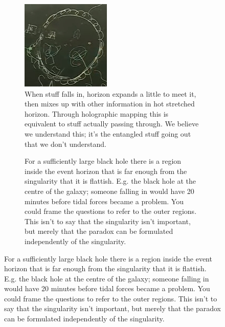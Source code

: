 \documentclass[]{article}
\begin{document}
\begin{figure}[H]
	\begin{center}
		\caption{	Questions.}
		\begin{subfigure}[t]{0.45\textwidth}
			\caption{When stuff falls in, horizon expands  a little to meet it, then mixes up with other information in hot stretched horizon. Through holographic mapping this is equivalent to stuff actually passing through. We believe we understand this; it's the entangled stuff going out that we don't understand.}\label{fig:ibh-horizon-falling-in}
			\includegraphics[width=\textwidth]{ibh-horizon-falling-in}
		\end{subfigure}
		\;
		\begin{subfigure}[t]{0.45\textwidth}
			\caption{For a sufficiently large black hole there is a region inside the event horizon that is far enough from the singularity that it is flattish. E.g. the black hole at the centre of the galaxy; someone falling in would have 20 minutes before tidal forces became a problem. You could frame the questions to refer to the outer regions. This isn't to say that the singularity isn't important, but merely that the paradox can be formulated independently of the singularity. }\label{fig:ibh-horizon-inside-large}

\end{subfigure}
\end{center}
\end{figure}
\end{document}
